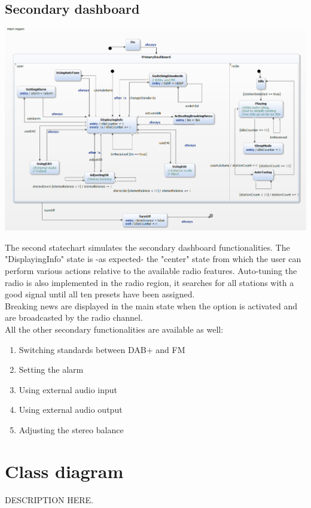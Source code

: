 \documentclass[11pt]{article}
\begin{document}
\subsection{Secondary dashboard}
\vspace{10px}
\begin{center}
\includegraphics[width=15cm]{../Diagrams/statechartSecondaryD-v1.png}\\
\end{center}
The second statechart simulates the secondary dashboard functionalities. The "DisplayingInfo" state is -as expected- the "center" state from which the user can perform various actions relative to the available radio features. Auto-tuning the radio is also implemented in the radio region, it searches for all stations with a good signal until all ten presets have been assigned.\\
Breaking news are displayed in the main state when the option is activated and are broadcasted by the radio channel.\\
All the other secondary functionalities are available as well:
\begin{enumerate}
\item Switching standards between DAB+ and FM
\item Setting the alarm
\item Using external audio input
\item Using external audio output
\item Adjusting the stereo balance
\end{enumerate}

\pagebreak
\section{Class diagram}
\vspace{10px}
\begin{center}
\end{center}
DESCRIPTION HERE.
\end{document}
